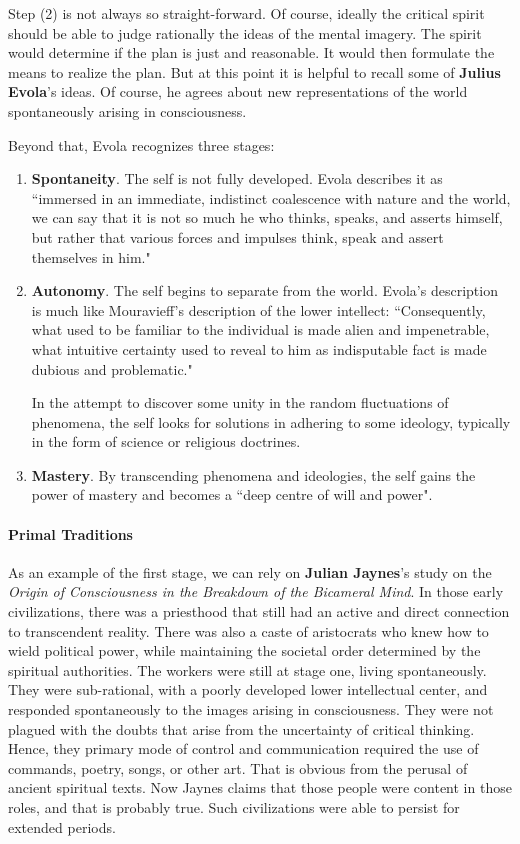 Step (2) is not always so straight-forward. Of course, ideally the critical spirit should be able to judge rationally the ideas of the mental imagery. The spirit would determine if the plan is just and reasonable. It would then formulate the means to realize the plan. But at this point it is helpful to recall some of \textbf{Julius Evola}'s ideas. Of course, he agrees about new representations of the world spontaneously arising in consciousness.

Beyond that, Evola recognizes three stages:

\begin{enumerate}
\item \textbf{Spontaneity}. The self is not fully developed. Evola describes it as ``immersed in an immediate, indistinct coalescence with nature and the world, we can say that it is not so much he who thinks, speaks, and asserts himself, but rather that various forces and impulses think, speak and assert themselves in him." 
\item \textbf{Autonomy}. The self begins to separate from the world. Evola's description is much like Mouravieff's description of the lower intellect: ``Consequently, what used to be familiar to the individual is made alien and impenetrable, what intuitive certainty used to reveal to him as indisputable fact is made dubious and problematic."

In the attempt to discover some unity in the random fluctuations of phenomena, the self looks for solutions in adhering to some ideology, typically in the form of science or religious doctrines. 
\item \textbf{Mastery}. By transcending phenomena and ideologies, the self gains the power of mastery and becomes a ``deep centre of will and power". 
\end{enumerate}
\paragraph{Primal Traditions}
As an example of the first stage, we can rely on \textbf{Julian Jaynes}'s study on the \emph{Origin of Consciousness in the Breakdown of the Bicameral Mind}. In those early civilizations, there was a priesthood that still had an active and direct connection to transcendent reality. There was also a caste of aristocrats who knew how to wield political power, while maintaining the societal order determined by the spiritual authorities. The workers were still at stage one, living spontaneously. They were sub-rational, with a poorly developed lower intellectual center, and responded spontaneously to the images arising in consciousness. They were not plagued with the doubts that arise from the uncertainty of critical thinking. Hence, they primary mode of control and communication required the use of commands, poetry, songs, or other art. That is obvious from the perusal of ancient spiritual texts. Now Jaynes claims that those people were content in those roles, and that is probably true. Such civilizations were able to persist for extended periods.

